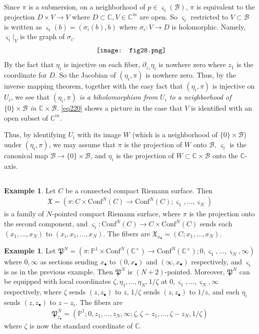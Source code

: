 \documentclass[12pt,a4paper,notitlepage]{article}
\theoremstyle{definition}
\newtheorem{eg}[df]{Example}
\theoremstyle{plain}
\newcommand{\fk}{\mathfrak}
\newcommand{\mc}{\mathcal}
\newcommand{\Conf}{\mathrm{Conf}}
\newcommand{\sgm}{\varsigma}
\newcommand{\blt}{\bullet}
\newcommand{\Cbb}{\mathbb C}
\newcommand{\Pbb}{\mathbb P}
\numberwithin{equation}{section}
\begin{document}
Since $\pi$ is a submersion, on a neighborhood of $p\in\sgm_i(\mc B)$, $\pi$ is equivalent to the projection $D\times V\rightarrow V$ where $D\subset\Cbb,V\in\Cbb^m$ are open. So $\sgm_i$ restricted to $V\subset\mc B$ is written as
 $\sgm_i(b)=(\sigma_i(b),b)$ where $\sigma_i:V\rightarrow D$ is holomorphic. Namely, $\sgm_i|_V$ is the graph of $\sigma_i$.
\begin{align}\label{eq220}
\vcenter{\hbox{{
\texttt{[image: fig28.png]}}}}
\end{align}
By the fact that $\eta_i$ is injective on each fiber, $\partial_{z_1}\eta_i$ is nowhere zero where $z_1$ is the coordinate for $D$. So the Jacobian of $(\eta_i,\pi)$ is nowhere zero. Thus, by the inverse mapping theorem, together with the easy fact that $(\eta_i,\pi)$ is injective on $U_i$, we see that \emph{$(\eta_i,\pi)$ is a biholomorphism from $U_i$ to a neighborhood of $\{0\}\times\mc B$ in $\Cbb\times\mc B$.} \eqref{eq220} shows a picture in the case that $V$ is identified with an open subset of $\Cbb^m$.

Thus, by identifying $U_i$ with its image $W$ (which is a neighborhood of $\{0\}\times\mc B$) under $(\eta_i,\pi)$, we may assume that $\pi$ is the projection of $W$  onto $\mc B$, $\sgm_i$ is the canonical map $\mc B\rightarrow\{0\}\times\mc B$, and $\eta_i$ is the projection of $W\subset\Cbb\times\mc B$ onto the $\Cbb$-axis.



\subsection{}

\begin{eg}
Let $C$ be a connected compact Riemann surface. Then
\begin{align*}
\fk X=(\pi:C\times\Conf^N(C)\rightarrow \Conf^N(C);\sgm_1,\dots,\sgm_N)
\end{align*}
is a family of $N$-pointed compact Riemann surface, where $\pi$ is the projection onto the second component, and $\sgm_i:\Conf^N(C)\rightarrow C\times \Conf^N(C)$ sends each $(x_1,\dots,x_N)$ to $(x_i,x_1,\dots,x_N)$. The fibers are $\fk X_{x_\blt}=(C;x_1,\dots,x_N)$.
\end{eg}

\begin{eg}\label{lb118}
Let $\fk P^N=(\pi:\Pbb^1\times\Conf^N(\Cbb^\times)\rightarrow\Conf^N(\Cbb^\times);0,\sgm_1,\dots,\sgm_N,\infty)$ where $0,\infty$ as sections sending $x_\blt$ to  $(0,x_\blt)$ and $(\infty,x_\blt)$ respectively, and $\sgm_i$ is as in the previous example. Then $\fk P^N$ is $(N+2)$-pointed. Moreover, $\fk P^N$ can be equipped with local coordinates $\zeta,\eta_1,\dots,\eta_N,1/\zeta$ at $0,\sgm_1,\dots,\sgm_N,\infty$ respectively, where $\zeta$ sends $(z,z_\blt)$ to $z$, $1/\zeta$ sends $(z,z_\blt)$ to $1/z$, and each $\eta_i$ sends $(z,z_\blt)$ to $z-z_i$. The fibers are
\begin{align*}
\fk P^N_{z_\blt}=(\Pbb^1;0,z_1,\dots,z_N,\infty;\zeta,\zeta-z_1,\dots,\zeta-z_N,1/\zeta)
\end{align*}
where $\zeta$ is now the standard coordinate of $\Cbb$.
\end{eg}
\end{document}
